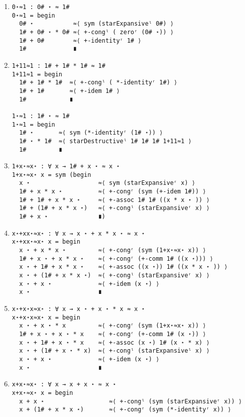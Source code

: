 \begin{enumerate}
\item
\begin{Verbatim}
0⋆≈1 : 0# ⋆ ≈ 1#
0⋆≈1 = begin
  0# ⋆           ≈⟨ sym (starExpansiveˡ 0#) ⟩
  1# + 0# ⋆ * 0# ≈⟨ +-congˡ ( zeroʳ (0# ⋆)) ⟩
  1# + 0#        ≈⟨ +-identityʳ 1# ⟩
  1#             ∎
\end{Verbatim}
\item
\begin{Verbatim}
1+11≈1 : 1# + 1# * 1# ≈ 1#
1+11≈1 = begin
  1# + 1# * 1#  ≈⟨ +-congˡ ( *-identityʳ 1#) ⟩
  1# + 1#       ≈⟨ +-idem 1# ⟩
  1#            ∎

1⋆≈1 : 1# ⋆ ≈ 1#
1⋆≈1 = begin
  1# ⋆       ≈⟨ sym (*-identityʳ (1# ⋆)) ⟩
  1# ⋆ * 1#  ≈⟨ starDestructiveˡ 1# 1# 1# 1+11≈1 ⟩
  1#         ∎
\end{Verbatim}
\item
\begin{Verbatim}
1+x⋆≈x⋆ : ∀ x → 1# + x ⋆ ≈ x ⋆
1+x⋆≈x⋆ x = sym (begin
  x ⋆                   ≈⟨ sym (starExpansiveʳ x) ⟩
  1# + x * x ⋆          ≈⟨ +-congʳ (sym (+-idem 1#)) ⟩
  1# + 1# + x * x ⋆     ≈⟨ +-assoc 1# 1# ((x * x ⋆ )) ⟩
  1# + (1# + x * x ⋆)   ≈⟨ +-congˡ (starExpansiveʳ x) ⟩
  1# + x ⋆              ∎)
\end{Verbatim}
\item
\begin{Verbatim}
x⋆+xx⋆≈x⋆ : ∀ x → x ⋆ + x * x ⋆ ≈ x ⋆
x⋆+xx⋆≈x⋆ x = begin
  x ⋆ + x * x ⋆         ≈⟨ +-congʳ (sym (1+x⋆≈x⋆ x)) ⟩
  1# + x ⋆ + x * x ⋆    ≈⟨ +-congʳ (+-comm 1# ((x ⋆))) ⟩
  x ⋆ + 1# + x * x ⋆    ≈⟨ +-assoc ((x ⋆)) 1# ((x * x ⋆ )) ⟩
  x ⋆ + (1# + x * x ⋆)  ≈⟨ +-congˡ (starExpansiveʳ x) ⟩
  x ⋆ + x ⋆             ≈⟨ +-idem (x ⋆) ⟩
  x ⋆                   ∎
\end{Verbatim}
\item
\begin{Verbatim}
x⋆+x⋆x≈x⋆ : ∀ x → x ⋆ + x ⋆ * x ≈ x ⋆
x⋆+x⋆x≈x⋆ x = begin
  x ⋆ + x ⋆ * x         ≈⟨ +-congʳ (sym (1+x⋆≈x⋆ x)) ⟩
  1# + x ⋆ + x ⋆ * x    ≈⟨ +-congʳ (+-comm 1# (x ⋆)) ⟩
  x ⋆ + 1# + x ⋆ * x    ≈⟨ +-assoc (x ⋆) 1# (x ⋆ * x) ⟩
  x ⋆ + (1# + x ⋆ * x)  ≈⟨ +-congˡ (starExpansiveˡ x) ⟩
  x ⋆ + x ⋆             ≈⟨ +-idem (x ⋆) ⟩
  x ⋆                   ∎
\end{Verbatim}
\item
\begin{Verbatim}
x+x⋆≈x⋆ : ∀ x → x + x ⋆ ≈ x ⋆
x+x⋆≈x⋆ x = begin
  x + x ⋆                  ≈⟨ +-congˡ (sym (starExpansiveʳ x)) ⟩
  x + (1# + x * x ⋆)       ≈⟨ +-congʳ (sym (*-identityʳ x)) ⟩

\end{Verbatim}
\end{enumerate}
